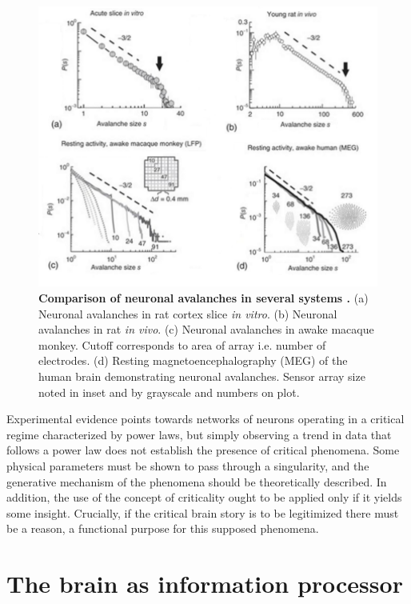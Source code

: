 \documentclass[12pt]{article}
\begin{document}
\begin{figure}      
  \begin{center}    
 \includegraphics[width=1\textwidth]{avalanchesplenzbook2}    
    \caption{\textbf{Comparison of neuronal avalanches in several systems \cite{Plenz2014}.} (a) Neuronal avalanches in rat cortex slice \textit{in vitro}. (b) Neuronal avalanches in rat \textit{in vivo}. (c) Neuronal avalanches in awake macaque monkey. Cutoff corresponds to area of array i.e. number of electrodes. (d) Resting magnetoencephalography (MEG) of the human brain demonstrating neuronal avalanches. Sensor array size noted in inset and by grayscale and numbers on plot.}
   \label{Figure::Neuronal avalanches in vitro and in vivo}   
  \end{center}     
   \end{figure}

Experimental evidence points towards networks of neurons operating in a critical regime characterized by power laws, but simply observing a trend in data that follows a power law does not establish the presence of critical phenomena. Some physical parameters must be shown to pass through a singularity, and the generative mechanism of the phenomena should be theoretically described. In addition, the use of the concept of criticality ought to be applied only if it yields some insight. Crucially, if the critical brain story is to be legitimized there must be a reason, a functional purpose for this supposed phenomena.   
      
\section*{The brain as information processor}
\end{document}
